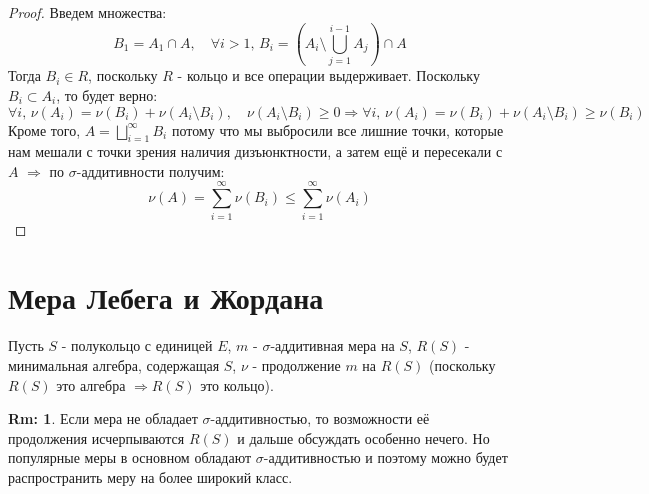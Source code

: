 \documentclass[12pt]{article}
\theoremstyle{definition}
\newtheorem{rem}{Rm:}
\begin{document}
\begin{proof}
	Введем множества: 
	$$
		B_1 = A_1 \cap A, \quad \forall i > 1, \, B_i = \left(A_i \setminus \bigcup\limits_{j = 1}^{i - 1}A_j\right) \cap A
	$$
	Тогда $B_i \in R$, поскольку $R$ - кольцо и все операции выдерживает. Поскольку $B_i \subset A_i$, то будет верно: 
	$$
		\forall i, \, \nu(A_i) = \nu(B_i) + \nu(A_i \setminus B_i), \quad \nu(A_i \setminus B_i) \geq 0 \Rightarrow \forall i, \,  \nu(A_i) = \nu(B_i) + \nu(A_i \setminus B_i) \geq \nu(B_i)
	$$ 
	Кроме того, $A = \bigsqcup\limits_{i = 1}^{\infty}B_i$ потому что мы выбросили все лишние точки, которые нам мешали с точки зрения наличия дизъюнктности, а затем ещё и пересекали с $A$ $\Rightarrow$ по $\sigma$-аддитивности получим:
	$$
		\nu(A) = \sum\limits_{i = 1}^{\infty}\nu(B_i) \leq \sum\limits_{i = 1}^{\infty}\nu(A_i)
	$$
\end{proof}
\newpage
\section*{Мера Лебега и Жордана}
Пусть $S$ - полукольцо с единицей $E$, $m$ - $\sigma$-аддитивная мера на $S$, $R(S)$ - минимальная алгебра, содержащая $S$, $\nu$ - продолжение $m$ на $R(S)$ (поскольку $R(S)$ это алгебра $\Rightarrow R(S)$ это кольцо).
\begin{rem}
	Если мера не обладает $\sigma$-аддитивностью, то возможности её продолжения исчерпываются $R(S)$ и дальше обсуждать особенно нечего. Но популярные меры в основном обладают $\sigma$-аддитивностью и поэтому можно будет распространить меру на более широкий класс.
\end{rem}
\end{document}
